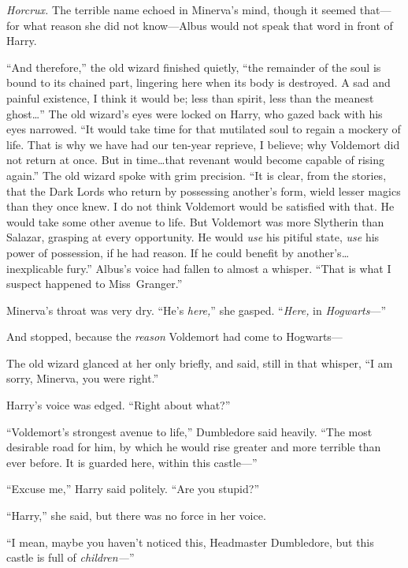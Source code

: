 \emph{Horcrux.} The terrible name echoed in Minerva’s mind, though it seemed that—for what reason she did not know—Albus would not speak that word in front of Harry.

“And therefore,” the old wizard finished quietly, “the remainder of the soul is bound to its chained part, lingering here when its body is destroyed. A sad and painful existence, I think it would be; less than spirit, less than the meanest ghost…” The old wizard’s eyes were locked on Harry, who gazed back with his eyes narrowed. “It would take time for that mutilated soul to regain a mockery of life. That is why we have had our ten-year reprieve, I believe; why Voldemort did not return at once. But in time…that revenant would become capable of rising again.” The old wizard spoke with grim precision. “It is clear, from the stories, that the Dark Lords who return by possessing another’s form, wield lesser magics than they once knew. I do not think Voldemort would be satisfied with that. He would take some other avenue to life. But Voldemort was more Slytherin than Salazar, grasping at every opportunity. He would \emph{use} his pitiful state, \emph{use} his power of possession, if he had reason. If he could benefit by another’s…inexplicable fury.” Albus’s voice had fallen to almost a whisper. “That is what I suspect happened to Miss~Granger.”

Minerva’s throat was very dry. “He’s \emph{here,}” she gasped. “\emph{Here,} in \emph{Hogwarts}—”

And stopped, because the \emph{reason} Voldemort had come to Hogwarts—

The old wizard glanced at her only briefly, and said, still in that whisper, “I am sorry, Minerva, you were right.”

Harry’s voice was edged. “Right about what?”

“Voldemort’s strongest avenue to life,” Dumbledore said heavily. “The most desirable road for him, by which he would rise greater and more terrible than ever before. It is guarded here, within this castle—”

“Excuse me,” Harry said politely. “Are you stupid?”

“Harry,” she said, but there was no force in her voice.

“I mean, maybe you haven’t noticed this, Headmaster Dumbledore, but this castle is full of \emph{children—}”

